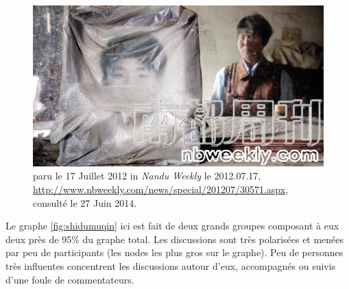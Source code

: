 \begin{figure}[h!]
    \centering
    \includegraphics[scale=0.7]{figures/chap3/chapitre3-shidumuqin.jpg}
    \caption[Photo illustrative de Shidu Muqin]{ paru le 17 Juillet 2012 in \textit{Nandu Weekly} le 2012.07.17, \url{http://www.nbweekly.com/news/special/201207/30571.aspx}, consulté le 27 Juin 2014.}
    \label{fig:photo-shidumuqin}
\end{figure}


\newpage


Le graphe \ref{fig:shidumuqin} ici est fait de deux grands groupes composant à eux deux près de 95\% du graphe total. Les discussions sont très polarisées et menées par peu de participants (les nodes les plus gros sur le graphe). Peu de personnes très influentes concentrent les discussions autour d{\textquoteright}eux, accompagnés ou suivis d{\textquoteright}une foule de commentateurs.  

